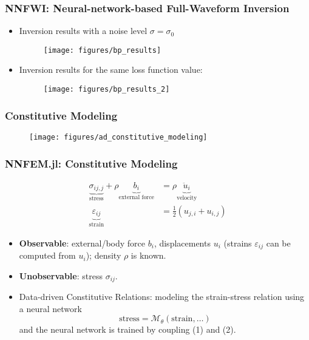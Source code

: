 \documentclass[usenames,dvipsnames]{beamer}
\begin{document}
\begin{frame}
	\frametitle{NNFWI: Neural-network-based Full-Waveform Inversion}

\begin{itemize}
	\item Inversion results with a noise level $\sigma = \sigma_0$
	\begin{figure}[hbt]
	\centering
  \texttt{[image: figures/bp\_results]}
\end{figure}

\item Inversion results for the same loss function value:
\begin{figure}[hbt]
\centering
  \texttt{[image: figures/bp\_results\_2]}
\end{figure}

\end{itemize}

\end{frame}

\begin{frame}
	\frametitle{Constitutive Modeling}
	
	\begin{figure}[hbt]
\centering
  \texttt{[image: figures/ad\_constitutive\_modeling]}
\end{figure}
\end{frame}


\begin{frame}
	\frametitle{NNFEM.jl: Constitutive Modeling}
	
	\begin{equation}\label{equ:momentum}
  \begin{aligned}
		\underbrace{\sigma_{ij,j}}_{\mbox{stress}} + \rho \underbrace{b_i}_{\mbox{external force}} &= \rho \underbrace{\ddot u_i}_{\mbox{velocity}}\\
		\underbrace{\varepsilon_{ij}}_{\mbox{strain}} &= \frac{1}{2}(u_{j,i}+u_{i,j})
	\end{aligned}
\end{equation}

	
	\begin{itemize}
		\item \textbf{Observable}: external/body force $b_i$, displacements $u_i$ (strains $\varepsilon_{ij}$ can be computed from $u_i$); density $\rho$ is known.  
		\item \textbf{Unobservable}: stress $\sigma_{ij}$. 
		\item Data-driven Constitutive Relations: modeling the strain-stress relation using a neural network
\begin{equation}\label{equ:nn}
  	\boxed{\mbox{stress} =\mathcal{M}_{\theta}(\mbox{strain},\ldots)}
\end{equation}
		and the neural network is trained by coupling (1) and (2).
	\end{itemize}


\end{frame}
\end{document}
